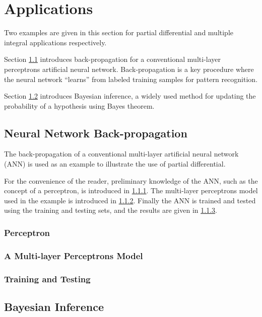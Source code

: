 \chapter{Applications}

Two examples are given in this section for partial differential and multiple integral applications respectively.

Section \ref{ch8sec:nnbackpropagation} introduces back-propagation for a conventional multi-layer perceptrons artificial neural network. Back-propagation is a key procedure where the neural network ``learns'' from labeled training samples for pattern recognition.

Section \ref{ch8sec:bayesianinference} introduces Bayesian inference, a widely used method for updating the probability of a hypothesis using Bayes theorem.

\section{Neural Network Back-propagation} \label{ch8sec:nnbackpropagation}

The back-propagation of a conventional multi-layer artificial neural network (ANN) is used as an example to illustrate the use of partial differential. 

For the convenience of the reader, preliminary knowledge of the ANN, such as the concept of a perceptron, is introduced in \ref{ch8subsec:perceptron}. The multi-layer perceptrons model used in the example is introduced in \ref{ch8subsec:multilayerperceptrons}. Finally the ANN is trained and tested using the training and testing sets, and the results are given in \ref{ch9subsec:trainingandtesting}.

\subsection{Perceptron} \label{ch8subsec:perceptron}

\subsection{A Multi-layer Perceptrons Model} \label{ch8subsec:multilayerperceptrons}

\subsection{Training and Testing} \label{ch9subsec:trainingandtesting}


\section{Bayesian Inference} \label{ch8sec:bayesianinference}
